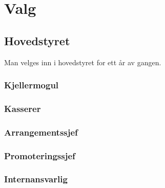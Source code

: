 \documentclass[10pt,norsk,a4paper]{article}
\begin{document}
\section{Valg}

\begin{minipage}[t]{9cm}
\subsection{Hovedstyret}
Man velges inn i hovedstyret for ett år av gangen.

\subsubsection{Kjellermogul}
\subsubsection{Kasserer}
\subsubsection{Arrangementssjef}
\subsubsection{Promoteringssjef}
\subsubsection{Internansvarlig}

\end{minipage}
\end{document}

